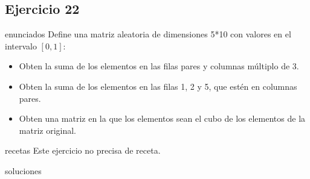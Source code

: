 \subsection{Ejercicio 22}
\def\parte{enunciados}
\ifx\capitulo\parte
Define una matriz aleatoria de dimensiones 5*10 con valores en el intervalo $[0,1]$:

\begin{itemize}
\item Obten la suma de los elementos en las filas pares y columnas múltiplo de 3.
\item Obten la suma de los elementos en las filas 1, 2 y 5, que estén en columnas pares.
\item Obten una matriz en la que los elementos sean el cubo de los elementos de la matriz original.
\end{itemize}
\fi

\def\parte{recetas}
\ifx\capitulo\parte
Este ejercicio no precisa de receta.
\fi

\def\parte{soluciones}
\ifx\capitulo\parte

\fi
